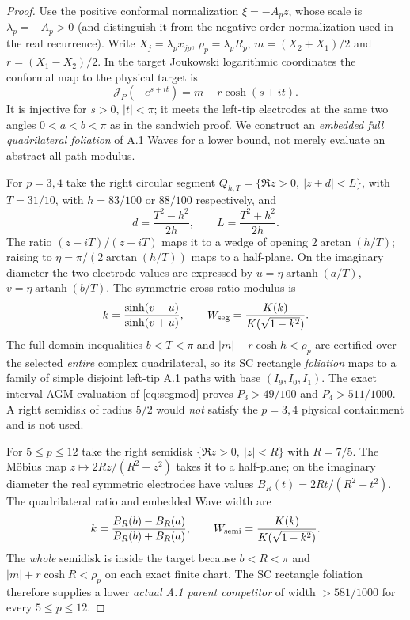\begin{proof}
Use the positive conformal
normalization $\xi=-A_pz$,
whose scale is $\lambda_p=-A_p>0$
(and distinguish it from
the negative-order normalization
used in the real recurrence).
Write $X_j=\lambda_px_{jp}$,
$\rho_p=\lambda_pR_p$,
$m=(X_2+X_1)/2$ and
$r=(X_1-X_2)/2$.  In the
target Joukowski logarithmic
coordinates the conformal map
to the physical target is
\[
 \mathcal{J}_P(-e^{s+it})=
 m-r\cosh(s+it).
\]
It is injective for $s>0$,
$|t|<\pi$; it meets the
left-tip electrodes at the
same two angles $0<a<b<\pi$
as in the sandwich proof.
We construct an \emph{embedded
full quadrilateral foliation}
of A.1 Waves for a lower
bound, not merely evaluate an
abstract all-path modulus.

For $p=3,4$ take the right
circular segment
$Q_{h,T}=\{\Re z>0,\ |z+d|<L\}$,
with $T=31/10$, with
$h=83/100$ or $88/100$
respectively, and
\[
 d=\frac{T^2-h^2}{2h},\qquad
 L=\frac{T^2+h^2}{2h}.
\]
The ratio $(z-iT)/(z+iT)$
maps it to a wedge of opening
$2\arctan(h/T)$; raising to
$\eta=\pi/(2\arctan(h/T))$
maps to a half-plane.
On the imaginary diameter
the two electrode values
are expressed by
$u=\eta\operatorname{artanh}(a/T)$,
$v=\eta\operatorname{artanh}(b/T)$.
The symmetric cross-ratio
modulus is
\begin{equation}\label{eq:segmod}
 k=\frac{\sinh(v-u)}{\sinh(v+u)},\qquad
 W_{\rm seg}=\frac{K(k)}{K(\sqrt{1-k^2})}.
\end{equation}
The full-domain inequalities
$b<T<\pi$ and
$|m|+r\cosh h<\rho_p$
are certified over the
selected \emph{entire}
complex quadrilateral,
so its SC rectangle
\emph{foliation} maps
to a family of simple
disjoint left-tip A.1
paths with base
$(I_9,I_0,I_1)$.
The exact interval
AGM evaluation
of \eqref{eq:segmod}
proves $P_3>49/100$
and $P_4>511/1000$.
A right semidisk of radius
$5/2$ would \emph{not}
satisfy the $p=3,4$
physical containment
and is not used.

For $5\le p\le12$
take the right semidisk
$\{\Re z>0,\ |z|<R\}$
with $R=7/5$.
The Möbius map
$z\mapsto2Rz/(R^2-z^2)$
takes it to a half-plane;
on the imaginary diameter
the real symmetric
electrodes have values
$B_R(t)=2Rt/(R^2+t^2)$.
The quadrilateral ratio
and embedded Wave width are
\begin{equation}\label{eq:semidiskmod}
 k=\frac{B_R(b)-B_R(a)}{B_R(b)+B_R(a)},
 \qquad W_{\rm semi}=\frac{K(k)}
                              {K(\sqrt{1-k^2})}.
\end{equation}
The \emph{whole} semidisk
is inside the target
because $b<R<\pi$
and $|m|+r\cosh R<\rho_p$
on each exact finite chart.
The SC rectangle foliation
therefore supplies a lower
\emph{actual A.1 parent
competitor} of width
$>581/1000$ for every
$5\le p\le12$.


\end{proof}
